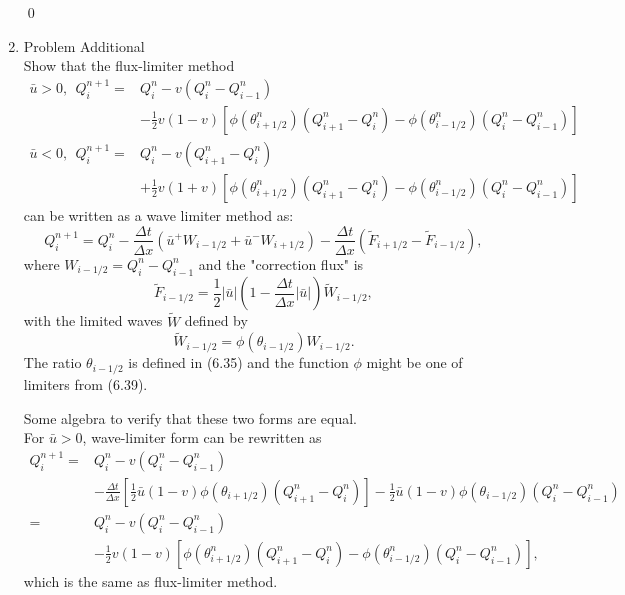 \documentclass[11pt]{article}
\begin{document}
\begin{enumerate}
\qed
\newpage
    \item Problem Additional \\
			Show that the flux-limiter method 
			\begin{align*}
			\bar{u}>0, \ \ Q_i^{n+1} = &Q_i^n-v(Q_i^n-Q_{i-1}^n)\\
			&-\frac{1}{2}v(1-v)[\phi(\theta_{i+1/2}^n)(Q_{i+1}^n-Q_i^n)-\phi(\theta_{i-1/2}^n)(Q_i^n-Q_{i-1}^n)]\\
			\bar{u}<0, \ \ Q_i^{n+1} = &Q_i^n-v(Q_{i+1}^n-Q_{i}^n)\\
			&+\frac{1}{2}v(1+v)[\phi(\theta_{i+1/2}^n)(Q_{i+1}^n-Q_i^n)-\phi(\theta_{i-1/2}^n)(Q_i^n-Q_{i-1}^n)]
			\end{align*}
			can be written as a wave limiter method as:
			\[
			Q_i^{n+1}=Q_i^n-\frac{\Delta t}{\Delta x}(\bar{u}^+W_{i-1/2}+\bar{u}^-W_{i+1/2})-\frac{\Delta t}{\Delta x}(\tilde{F}_{i+1/2}-\tilde{F}_{i-1/2}),
			\]
			where $W_{i-1/2}=Q_i^n-Q_{i-1}^n$ and the "correction flux" is
			\[
			\tilde{F}_{i-1/2}=\frac{1}{2}|\bar{u}|(1-\frac{\Delta t}{\Delta x}|\bar{u}|)\tilde{W}_{i-1/2},
			\]
			with the limited waves $\tilde{W}$ defined by
			\[
			\tilde{W}_{i-1/2}=\phi(\theta_{i-1/2})W_{i-1/2}.
			\]
			The ratio $\theta_{i-1/2}$ is defined in (6.35) and the function $\phi$ might be one of limiters from (6.39).
			
        \vskip 5pt
        \vskip 5pt
        
        	Some algebra to verify that these two forms are equal.\\
        	
        	For $\bar{u}>0$, wave-limiter form can be rewritten as 
        	\begin{align*}
        	Q_i^{n+1} = &Q_i^n-v(Q_i^n-Q_{i-1}^n)\\
			&-\frac{\Delta t}{\Delta x}[\frac{1}{2}\bar{u}(1-v)\phi(\theta_{i+1/2})(Q_{i+1}^n-Q_i^n)]-\frac{1}{2}\bar{u}(1-v)\phi(\theta_{i-1/2})(Q_i^n-Q_{i-1}^n)\\
			= &Q_i^n-v(Q_i^n-Q_{i-1}^n)\\
			&-\frac{1}{2}v(1-v)[\phi(\theta_{i+1/2}^n)(Q_{i+1}^n-Q_i^n)-\phi(\theta_{i-1/2}^n)(Q_i^n-Q_{i-1}^n)],
        	\end{align*}
            which is the same as flux-limiter method.\\
            

\end{enumerate}
\end{document}
